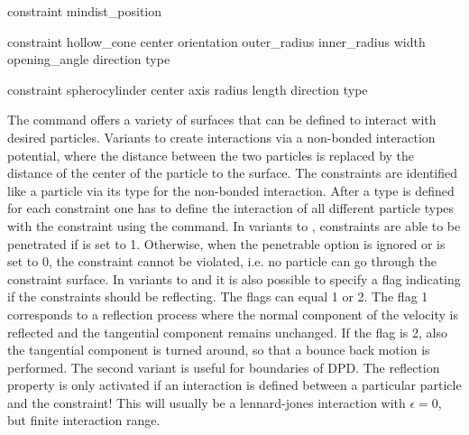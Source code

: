 \begin{essyntax}
  constraint mindist_position   

  constraint hollow_cone center    orientation   
  outer_radius  inner_radius  width  opening_angle  direction  
  type   

  constraint spherocylinder center    
  axis    
  radius  length  
  direction  
  type    

  \begin{features}
  \end{features}
\end{essyntax}

The  command offers a variety of surfaces that can
be defined to interact with desired particles. Variants  to
 create interactions via a non-bonded interaction
potential, where the distance between the two particles is replaced by
the distance of the center of the particle to the surface. The
constraints are identified like a particle via its type for the
non-bonded interaction.  After a type is defined for each constraint
one has to define the interaction of all different particle types with
the constraint using the  command. In variants
 to , constraints are able to be penetrated if
 is set to 1. Otherwise, when the penetrable option is
ignored or  is set to 0, the constraint cannot be violated,
i.e. no particle can go through the constraint surface.  In variants
 to  and  it is also possible to
specify a flag indicating if the constraints should be reflecting. The
flags can equal 1 or 2.  The flag 1 corresponds to a reflection
process where the normal component of the velocity is reflected and
the tangential component remains unchanged. If the flag is 2, also the
tangential component is turned around, so that a bounce back motion is
performed. The second variant is useful for boundaries of DPD.  The
reflection property is only activated if an interaction is defined
between a particular particle and the constraint! This will usually be
a lennard-jones interaction with $\epsilon=0$, but finite interaction
range.


